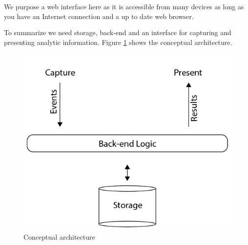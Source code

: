 We purpose a web interface here as it is accessible from many devices as long as you have an Internet connection and a up to date web browser. 



To summarize we need storage, back-end and an interface for capturing and presenting analytic information. Figure \ref{fig:conept_arch} shows the conceptual architecture. 

\begin{figure}[ht!]
\centering
\includegraphics[width=150mm]{images/architecture/conceptual_architecture.png}
\caption{Conceptual architecture}
\label{fig:conept_arch}
\end{figure}

